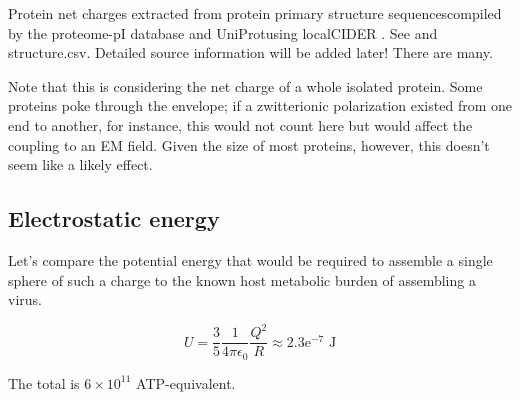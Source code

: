\documentclass[paper.tex]{subfiles}
\begin{document}
Protein net charges extracted from protein primary structure sequences\footnotemark compiled by the proteome-pI database \cite{ProteomepI2017} and UniProt\footnotemark using localCIDER \cite{CIDER2017}. See  and structure.csv. Detailed source information will be added later! There are many.

Note that this is considering the net charge of a whole isolated protein. Some proteins poke through the envelope; if a zwitterionic polarization existed from one end to another, for instance, this would not count here but would affect the coupling to an EM field. Given the size of most proteins, however, this doesn't seem like a likely effect.



\subsection{Electrostatic energy}

Let's compare the potential energy that would be required to assemble a single sphere of such a charge to the known host metabolic burden of assembling a virus.


$$ U = \frac{3}{5}  \frac{1}{4 \pi \epsilon_0} \frac{Q^2}{R} \approx 2.3\text{e}^{-7} \text{ J} $$

The total is $6 \times 10^{11}$ ATP-equivalent.
\end{document}
